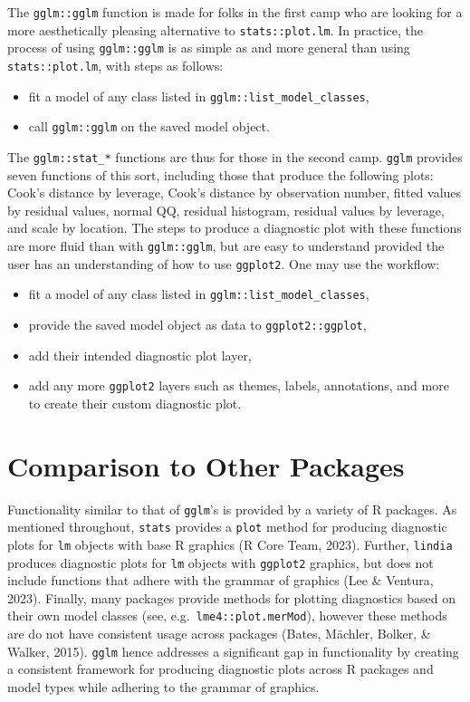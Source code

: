 \documentclass[10pt,a4paper,onecolumn]{article}
\providecommand{\tightlist}{%
  \setlength{\itemsep}{0pt}\setlength{\parskip}{0pt}}
\begin{document}
The \texttt{gglm::gglm} function is made for folks in the first camp who
are looking for a more aesthetically pleasing alternative to
\texttt{stats::plot.lm}. In practice, the process of using
\texttt{gglm::gglm} is as simple as and more general than using
\texttt{stats::plot.lm}, with steps as follows:

\begin{itemize}
\tightlist
\item
  fit a model of any class listed in
  \texttt{gglm::list\_model\_classes},
\item
  call \texttt{gglm::gglm} on the saved model object.
\end{itemize}

The \texttt{gglm::stat\_*} functions are thus for those in the second
camp. \texttt{gglm} provides seven functions of this sort, including
those that produce the following plots: Cook's distance by leverage,
Cook's distance by observation number, fitted values by residual values,
normal QQ, residual histogram, residual values by leverage, and scale by
location. The steps to produce a diagnostic plot with these functions
are more fluid than with \texttt{gglm::gglm}, but are easy to understand
provided the user has an understanding of how to use \texttt{ggplot2}.
One may use the workflow:

\begin{itemize}
\tightlist
\item
  fit a model of any class listed in
  \texttt{gglm::list\_model\_classes},
\item
  provide the saved model object as data to \texttt{ggplot2::ggplot},
\item
  add their intended diagnostic plot layer,
\item
  add any more \texttt{ggplot2} layers such as themes, labels,
  annotations, and more to create their custom diagnostic plot.
\end{itemize}

\hypertarget{comparison-to-other-packages}{%
\section{Comparison to Other
Packages}\label{comparison-to-other-packages}}

Functionality similar to that of \texttt{gglm}'s is provided by a
variety of R packages. As mentioned throughout, \texttt{stats} provides
a \texttt{plot} method for producing diagnostic plots for \texttt{lm}
objects with base R graphics (R Core Team, 2023). Further,
\texttt{lindia} produces diagnostic plots for \texttt{lm} objects with
\texttt{ggplot2} graphics, but does not include functions that adhere
with the grammar of graphics (Lee \& Ventura, 2023). Finally, many
packages provide methods for plotting diagnostics based on their own
model classes (see, e.g.~\texttt{lme4::plot.merMod}), however these
methods are do not have consistent usage across packages (Bates,
Mächler, Bolker, \& Walker, 2015). \texttt{gglm} hence addresses a
significant gap in functionality by creating a consistent framework for
producing diagnostic plots across R packages and model types while
adhering to the grammar of graphics.
\end{document}
